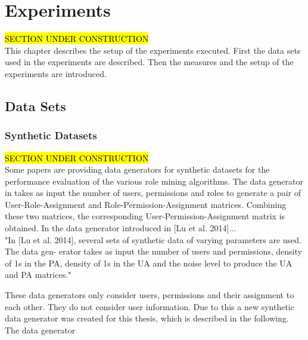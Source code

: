 \newpage
\section{Experiments}
\hl{SECTION UNDER CONSTRUCTION}\\
This chapter describes the setup of the experiments executed. First the data sets used in the experiments are described. Then the measures and the setup of the experiments are introduced.

\subsection{Data Sets}
\subsubsection{Synthetic Datasets}
\hl{SECTION UNDER CONSTRUCTION}\\
Some papers are providing data generators for synthetic datasets for the performance evaluation of the various role mining algorithms. The data generator in \cite{Vaidya:2006:RMR:1180405.1180424} takes as input the number of users, permissions and roles to generate a pair of User-Role-Assignment and Role-Permission-Assignment matrices. Combining these two matrices, the corresponding User-Permission-Assignment matrix is obtained.
In the data generator introduced in [Lu et al. 2014]...\\
"In [Lu et al. 2014], several sets of synthetic data of varying parameters are used. The data gen- erator takes as input the number of users and permissions, density of 1s in the PA, density of 1s in the UA and the noise level to produce the UA and PA matrices."

These data generators only consider users, permissions and their assignment to each other. They do not consider user information. Due to this a new synthetic data generator was created for this thesis, which is described in the following.
The data generator 

